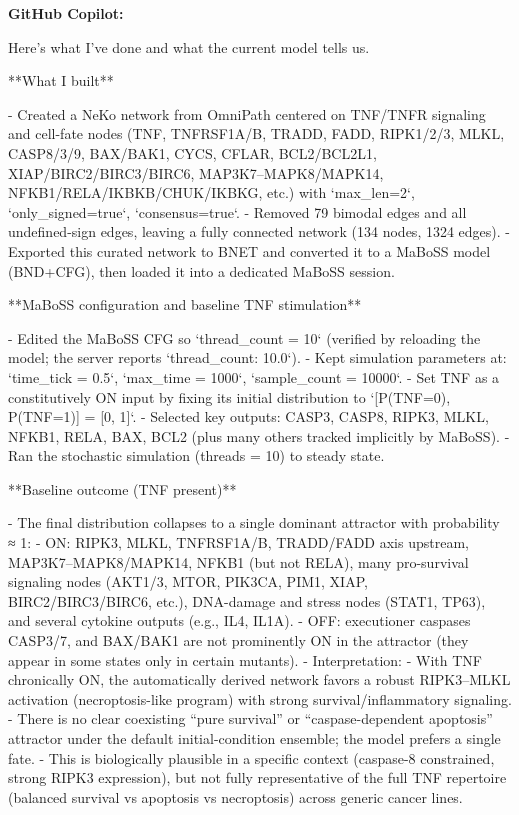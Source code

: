\documentclass[11pt,a4paper]{article}
\begin{document}
\begin{copilotbox}
\textbf{GitHub Copilot:}

Here’s what I’ve done and what the current model tells us.

**What I built**

- Created a NeKo network from OmniPath centered on TNF/TNFR signaling and cell-fate nodes (TNF, TNFRSF1A/B, TRADD, FADD, RIPK1/2/3, MLKL, CASP8/3/9, BAX/BAK1, CYCS, CFLAR, BCL2/BCL2L1, XIAP/BIRC2/BIRC3/BIRC6, MAP3K7–MAPK8/MAPK14, NFKB1/RELA/IKBKB/CHUK/IKBKG, etc.) with `max\_len=2`, `only\_signed=true`, `consensus=true`.
- Removed 79 bimodal edges and all undefined-sign edges, leaving a fully connected network (134 nodes, 1324 edges).
- Exported this curated network to BNET and converted it to a MaBoSS model (BND+CFG), then loaded it into a dedicated MaBoSS session.

**MaBoSS configuration and baseline TNF stimulation**

- Edited the MaBoSS CFG so `thread\_count = 10` (verified by reloading the model; the server reports `thread\_count: 10.0`).
- Kept simulation parameters at: `time\_tick = 0.5`, `max\_time = 1000`, `sample\_count = 10000`.
- Set TNF as a constitutively ON input by fixing its initial distribution to `[P(TNF=0), P(TNF=1)] = [0, 1]`.
- Selected key outputs: CASP3, CASP8, RIPK3, MLKL, NFKB1, RELA, BAX, BCL2 (plus many others tracked implicitly by MaBoSS).
- Ran the stochastic simulation (threads = 10) to steady state.

**Baseline outcome (TNF present)**

- The final distribution collapses to a single dominant attractor with probability ≈ 1:
  - ON: RIPK3, MLKL, TNFRSF1A/B, TRADD/FADD axis upstream, MAP3K7–MAPK8/MAPK14, NFKB1 (but not RELA), many pro-survival signaling nodes (AKT1/3, MTOR, PIK3CA, PIM1, XIAP, BIRC2/BIRC3/BIRC6, etc.), DNA-damage and stress nodes (STAT1, TP63), and several cytokine outputs (e.g., IL4, IL1A).
  - OFF: executioner caspases CASP3/7, and BAX/BAK1 are not prominently ON in the attractor (they appear in some states only in certain mutants).
- Interpretation:
  - With TNF chronically ON, the automatically derived network favors a robust RIPK3–MLKL activation (necroptosis-like program) with strong survival/inflammatory signaling.
  - There is no clear coexisting “pure survival” or “caspase-dependent apoptosis” attractor under the default initial-condition ensemble; the model prefers a single fate.
  - This is biologically plausible in a specific context (caspase-8 constrained, strong RIPK3 expression), but not fully representative of the full TNF repertoire (balanced survival vs apoptosis vs necroptosis) across generic cancer lines.


\end{copilotbox}
\end{document}

